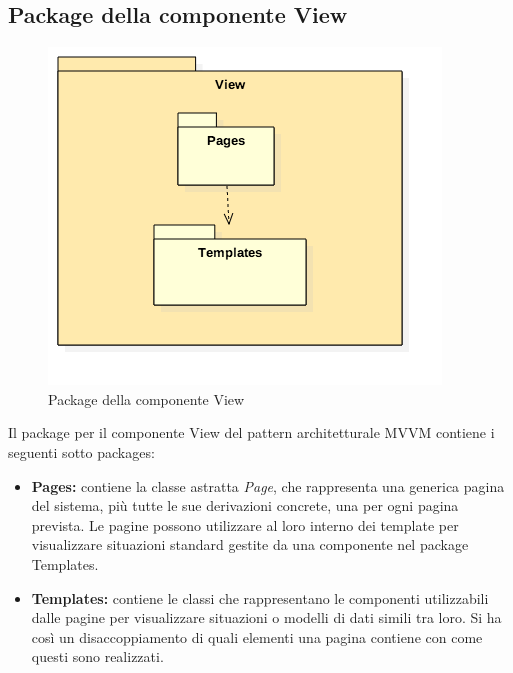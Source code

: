 \subsection{Package della componente View}
	\begin{figure}[h!]
	\begin{center}
		\includegraphics[scale=0.6]{../images/ViewPackage.png}
		\caption{Package della componente View}
	\end{center}
	\end{figure}
	Il package per il componente View del pattern architetturale MVVM contiene i seguenti sotto packages:
	\begin{itemize}
		\item\textbf{Pages:} contiene la classe astratta \textit{Page}, che rappresenta una generica pagina del sistema, più tutte le sue derivazioni concrete, una per ogni pagina prevista. Le pagine possono utilizzare al loro interno dei template per visualizzare situazioni standard gestite da una componente nel package Templates.
		\item\textbf{Templates:} contiene le classi che rappresentano le componenti utilizzabili dalle pagine per visualizzare situazioni o modelli di dati simili tra loro. Si ha così un disaccoppiamento di quali elementi una pagina contiene con come questi sono realizzati.\\
\\
\end{itemize}	